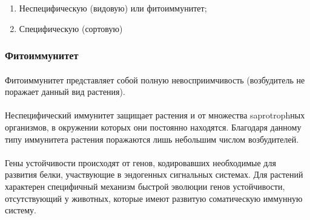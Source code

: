 \begin{enumerate}
	\item Неспецифическую (видовую) или фитоиммунитет;
	\item Специфическую (сортовую)
\end{enumerate}

\subsubsection*{Фитоиммунитет}

\paragraph*{}Фитоиммунитет представляет собой полную невосприимчивость (возбудитель не поражает данный вид растения). 

 \paragraph*{}Неспецифический иммунитет защищает растения и от множества \gls{saprotroph}ных организмов, в окружении которых они постоянно находятся. Благодаря данному типу иммунитета растения поражаются лишь небольшим числом возбудителей. 

\paragraph*{}Гены устойчивости происходят от генов, кодировавших необходимые для развития белки, участвующие в эндогенных сигнальных системах. Для растений характерен специфичный механизм быстрой эволюции генов устойчивости, отсутствующий у животных, которые имеют развитую соматическую иммунную систему.
 

